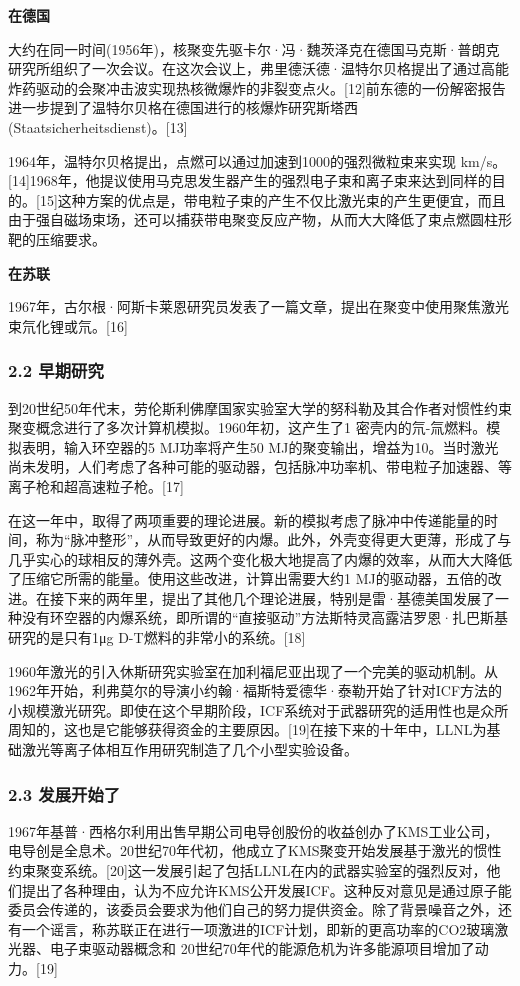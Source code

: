\textbf{在德国}

大约在同一时间(1956年)，核聚变先驱卡尔·冯·魏茨泽克在德国马克斯·普朗克研究所组织了一次会议。在这次会议上，弗里德沃德·温特尔贝格提出了通过高能炸药驱动的会聚冲击波实现热核微爆炸的非裂变点火。[12]前东德的一份解密报告进一步提到了温特尔贝格在德国进行的核爆炸研究斯塔西(Staatsicherheitsdienst)。[13]

1964年，温特尔贝格提出，点燃可以通过加速到1000的强烈微粒束来实现 km/s。[14]1968年，他提议使用马克思发生器产生的强烈电子束和离子束来达到同样的目的。[15]这种方案的优点是，带电粒子束的产生不仅比激光束的产生更便宜，而且由于强自磁场束场，还可以捕获带电聚变反应产物，从而大大降低了束点燃圆柱形靶的压缩要求。

\textbf{在苏联}

1967年，古尔根·阿斯卡莱恩研究员发表了一篇文章，提出在聚变中使用聚焦激光束氘化锂或氘。[16]
\subsubsection{2.2 早期研究}
到20世纪50年代末，劳伦斯利佛摩国家实验室大学的努科勒及其合作者对惯性约束聚变概念进行了多次计算机模拟。1960年初，这产生了1 密壳内的氘-氚燃料。模拟表明，输入环空器的5 MJ功率将产生50 MJ的聚变输出，增益为10。当时激光尚未发明，人们考虑了各种可能的驱动器，包括脉冲功率机、带电粒子加速器、等离子枪和超高速粒子枪。[17]

在这一年中，取得了两项重要的理论进展。新的模拟考虑了脉冲中传递能量的时间，称为“脉冲整形”，从而导致更好的内爆。此外，外壳变得更大更薄，形成了与几乎实心的球相反的薄外壳。这两个变化极大地提高了内爆的效率，从而大大降低了压缩它所需的能量。使用这些改进，计算出需要大约1 MJ的驱动器，五倍的改进。在接下来的两年里，提出了其他几个理论进展，特别是雷·基德美国发展了一种没有环空器的内爆系统，即所谓的“直接驱动”方法斯特灵高露洁罗恩·扎巴斯基研究的是只有1μg D-T燃料的非常小的系统。[18]

1960年激光的引入休斯研究实验室在加利福尼亚出现了一个完美的驱动机制。从1962年开始，利弗莫尔的导演小约翰·福斯特爱德华·泰勒开始了针对ICF方法的小规模激光研究。即使在这个早期阶段，ICF系统对于武器研究的适用性也是众所周知的，这也是它能够获得资金的主要原因。[19]在接下来的十年中，LLNL为基础激光等离子体相互作用研究制造了几个小型实验设备。
\subsubsection{2.3 发展开始了}
1967年基普·西格尔利用出售早期公司电导创股份的收益创办了KMS工业公司，电导创是全息术。20世纪70年代初，他成立了KMS聚变开始发展基于激光的惯性约束聚变系统。[20]这一发展引起了包括LLNL在内的武器实验室的强烈反对，他们提出了各种理由，认为不应允许KMS公开发展ICF。这种反对意见是通过原子能委员会传递的，该委员会要求为他们自己的努力提供资金。除了背景噪音之外，还有一个谣言，称苏联正在进行一项激进的ICF计划，即新的更高功率的CO2玻璃激光器、电子束驱动器概念和 20世纪70年代的能源危机为许多能源项目增加了动力。[19]

